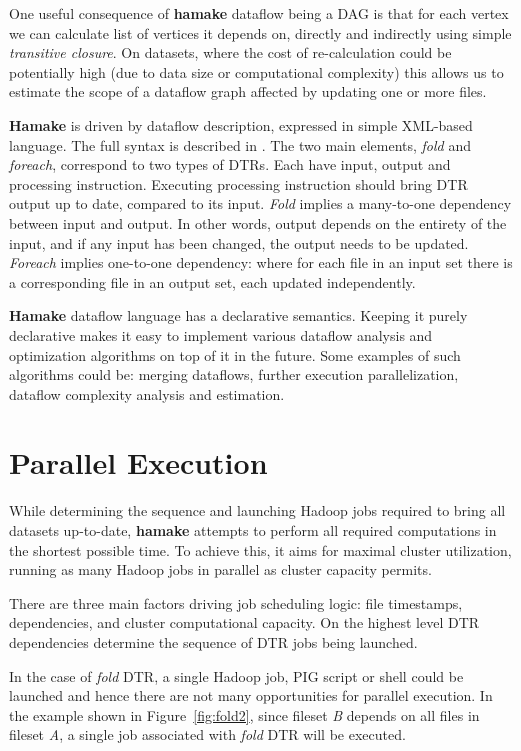 \documentclass[10pt,conference,letterpaper]{IEEEtran}
\begin{document}
One useful consequence of \textbf{hamake} dataflow being a DAG is
that for each vertex we can calculate list of vertices it depends on,
directly and indirectly using simple \textit{transitive closure}. On
datasets, where the cost of re-calculation could be potentially high
(due to data size or computational complexity) this allows us to estimate
the scope of a dataflow graph affected by updating one or more files.

\textbf{Hamake} is driven by dataflow description, expressed in simple
XML-based language. The full syntax is described in
\cite{hamakesyntax}. The two main elements, \emph{fold} and \emph{foreach},
 correspond to two types of DTRs. Each have input,
output and processing instruction. Executing processing instruction
should bring DTR output up to date, compared to its
input. \emph{Fold} implies a many-to-one dependency between input and
 output. In other words, output depends on the entirety of the input, and if
any input has been changed, the output needs to be
updated. \emph{Foreach} implies one-to-one dependency: where for each
file in an input set there is a corresponding file in an output set, each updated independently.

\textbf{Hamake} dataflow language has a declarative semantics. Keeping it
purely declarative makes it easy to implement various
dataflow analysis and optimization algorithms on top of it in the future. Some
examples of such algorithms could be: merging dataflows, further
execution parallelization, dataflow complexity analysis and
estimation.

\section{Parallel Execution}

While determining the sequence and launching Hadoop jobs required to
bring all datasets up-to-date, \textbf{hamake} attempts to perform all
required computations in the shortest possible time. To achieve this, it
aims for maximal cluster utilization, running as many Hadoop jobs in
parallel as cluster capacity permits.

There are three main factors driving job scheduling logic: file
timestamps, dependencies, and cluster computational capacity. On the
highest level DTR dependencies determine the sequence of DTR jobs being
launched.

In the case of \emph{fold} DTR, a single Hadoop job, PIG script or shell
could be launched and hence there are not many opportunities for
parallel execution. In the example shown in Figure~\ref{fig:fold2}, since
fileset \textit{B} depends on all files in fileset \textit{A}, a
single job associated with \emph{fold} DTR will be executed.
\end{document}
